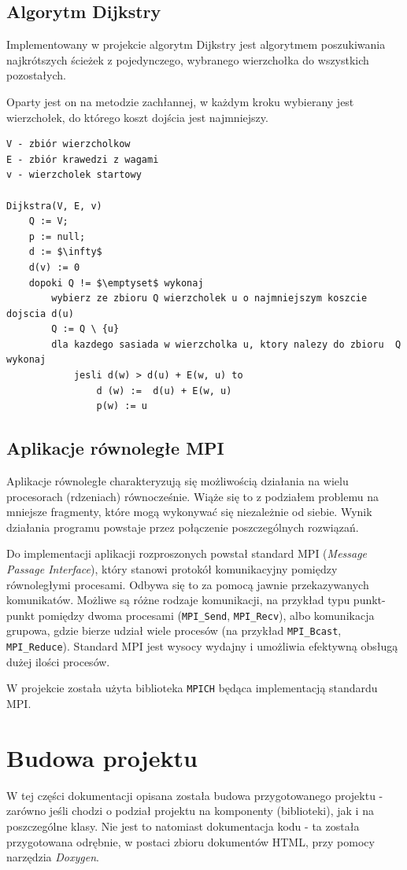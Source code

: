 \documentclass[12pt]{article}
\begin{document}
\subsection{Algorytm Dijkstry}
Implementowany w projekcie algorytm Dijkstry jest algorytmem poszukiwania najkrótszych ścieżek z pojedynczego, wybranego wierzchołka do wszystkich pozostałych. 

Oparty jest on na metodzie zachłannej, w każdym kroku wybierany jest wierzchołek, do którego koszt dojścia jest najmniejszy. 

\begin{lstlisting}[caption={Pseudokod algorytmu Dijkstry.}, captionpos=b, mathescape=true]
V - zbiór wierzcholkow
E - zbiór krawedzi z wagami
v - wierzcholek startowy

Dijkstra(V, E, v)
	Q := V;
	p := null;
	d := $\infty$
	d(v) := 0
	dopoki Q != $\emptyset$ wykonaj
		wybierz ze zbioru Q wierzcholek u o najmniejszym koszcie dojscia d(u)
		Q := Q \ {u}
		dla kazdego sasiada w wierzcholka u, ktory nalezy do zbioru  Q wykonaj
			jesli d(w) > d(u) + E(w, u) to
				d (w) :=  d(u) + E(w, u)
				p(w) := u
\end{lstlisting}

\subsection{Aplikacje równoległe MPI}
Aplikacje równoległe charakteryzują się możliwością działania na wielu procesorach (rdzeniach) równocześnie. Wiąże się to z podziałem problemu na mniejsze fragmenty, które mogą wykonywać się niezależnie od siebie. Wynik działania programu powstaje przez połączenie poszczególnych rozwiązań.

Do implementacji aplikacji rozproszonych powstał standard MPI (\textit{Message Passage Interface}), który stanowi protokół komunikacyjny pomiędzy równoległymi procesami. Odbywa się to za pomocą jawnie przekazywanych komunikatów. Możliwe są różne rodzaje komunikacji, na przykład typu punkt-punkt pomiędzy dwoma procesami (\lstinline|MPI_Send|, \lstinline|MPI_Recv|), albo komunikacja grupowa, gdzie bierze udział wiele procesów (na przykład \lstinline|MPI_Bcast|, \lstinline|MPI_Reduce|). Standard MPI jest wysocy wydajny i umożliwia efektywną obsługą dużej ilości procesów.

W projekcie została użyta biblioteka \lstinline|MPICH| będąca implementacją standardu MPI.

\section{Budowa projektu}
W tej części dokumentacji opisana została budowa przygotowanego projektu - zarówno jeśli chodzi o podział projektu na komponenty (biblioteki), jak i na poszczególne klasy. Nie jest to natomiast dokumentacja kodu - ta została przygotowana odrębnie, w postaci zbioru dokumentów HTML, przy pomocy narzędzia \textit{Doxygen}.
\end{document}
